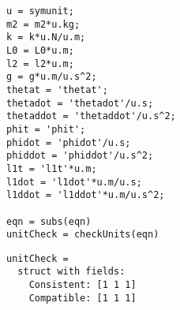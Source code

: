 \begin{lstlisting}[frame=lines,style=Matlab-editor]
% Checking EOM Units
u = symunit;
m2 = m2*u.kg;
k = k*u.N/u.m;
L0 = L0*u.m;
l2 = l2*u.m;
g = g*u.m/u.s^2;
thetat = 'thetat';
thetadot = 'thetadot'/u.s;
thetaddot = 'thetaddot'/u.s^2;
phit = 'phit';
phidot = 'phidot'/u.s;
phiddot = 'phiddot'/u.s^2;
l1t = 'l1t'*u.m;
l1dot = 'l1dot'*u.m/u.s;
l1ddot = 'l1ddot'*u.m/u.s^2;

eqn = subs(eqn)
unitCheck = checkUnits(eqn)
\end{lstlisting}
\color{gray} \begin{verbatim}
unitCheck =
  struct with fields:
    Consistent: [1 1 1]
    Compatible: [1 1 1]
\end{verbatim} \color{black}
